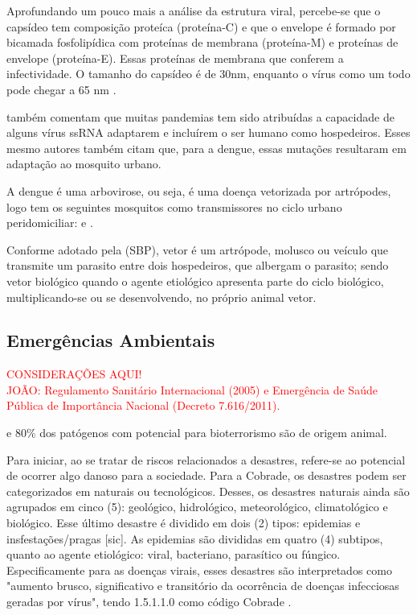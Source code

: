 \indent Aprofundando um pouco mais a análise da estrutura viral, percebe-se que o capsídeo tem composição proteíca (proteína-C) e que o envelope é formado por bicamada fosfolipídica com proteínas de membrana (proteína-M) e proteínas de envelope (proteína-E). Essas proteínas de membrana que conferem a infectividade. O tamanho do capsídeo é de 30nm, enquanto o vírus como um todo pode chegar a 65 nm \cite{Fiocruz2010Atlas}. 

 também comentam que muitas pandemias tem sido atribuídas a capacidade de alguns vírus \acrshort{ssRNA} adaptarem e incluírem o ser humano como hospedeiros. Esses mesmo autores também citam que, para a dengue, essas mutações resultaram em adaptação ao mosquito urbano.

\indent A dengue é uma arbovirose, ou seja, é uma doença vetorizada por artrópodes, logo tem os seguintes mosquitos como transmissores no ciclo urbano peridomiciliar:  e  \cite{ArboviralTransmission}.

\indent Conforme adotado pela  (\acrshort{SBP}), vetor é um artrópode, molusco ou veículo que transmite um parasito entre dois hospedeiros, que albergam o parasito; sendo vetor biológico quando o agente etiológico apresenta parte do ciclo biológico, multiplicando-se ou se desenvolvendo, no próprio animal vetor.

\subsection{Emergências Ambientais}

\begin{center}
\textcolor{red}{CONSIDERAÇÕES AQUI!}\\ 
\textcolor{red}{JOÃO: Regulamento Sanitário Internacional (2005) e Emergência de Saúde Pública de Importância Nacional (Decreto 7.616/2011).}
\end{center}

\indent e 80\% dos patógenos com potencial para bioterrorismo são de origem animal. 

\indent Para iniciar, ao se tratar de riscos relacionados a desastres, refere-se ao
potencial de ocorrer algo danoso para a sociedade. Para a \acrfull{Cobrade}, os desastres podem ser categorizados em naturais ou tecnológicos. Desses, os desastres naturais ainda são agrupados em cinco (5): geológico, hidrológico, meteorológico, climatológico e biológico. Esse último desastre é dividido em dois (2) tipos: epidemias e insfestações/pragas [sic]. As epidemias são divididas em quatro (4) subtipos,  quanto ao agente etiológico: viral, bacteriano, parasítico ou fúngico. Especificamente para as doenças virais, esses desastres são interpretados como "aumento brusco, significativo e transitório da ocorrência de doenças infecciosas geradas por vírus", tendo 1.5.1.1.0 como código \acrshort{Cobrade} \cite{GIRD}.

